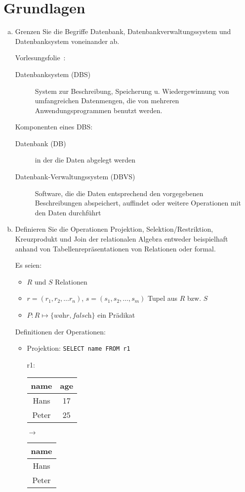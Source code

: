 \section{Grundlagen}
\begin{enumerate}[a)]
	\item Grenzen Sie die Begriffe Datenbank, Datenbankverwaltungssystem und Datenbanksystem voneinander ab.

	\begin{solution}
	Vorlesungsfolie~\DBSvsDBvsDBMS:
	\begin{description}
		\item[Datenbanksystem (DBS)] System zur Beschreibung, Speicherung u. Wiedergewinnung von umfangreichen Datenmengen, die von mehreren Anwendungsprogrammen benutzt werden.
	\end{description}
	Komponenten eines DBS:
	\begin{description}
		\item[Datenbank (DB)] in der die Daten abgelegt werden
		\item[Datenbank-Verwaltungssystem (DBVS)] Software, die die Daten entsprechend den vorgegebenen Beschreibungen abspeichert, auffindet oder weitere Operationen mit den Daten durchführt
	\end{description}
	\end{solution}


	\item Definieren Sie die Operationen Projektion, Selektion/Restriktion, Kreuzprodukt und Join der relationalen Algebra entweder beispielhaft anhand von Tabellenrepräsentationen von Relationen oder formal.

	\begin{solution}
	Es seien:
	\begin{itemize}
		\item $R$ und $S$ Relationen
		\item $r = (r_1, r_2, \ldots r_n)$, $s = (s_1, s_2, \ldots, s_m)$ Tupel aus $R$ bzw. $S$
		\item $P: R \mapsto \{\textit{wahr}, \textit{falsch}\}$ ein Prädikat
	\end{itemize}

	Definitionen der Operationen:

	\begin{itemize}
		\item Projektion: \texttt{SELECT name FROM r1}

		r1: \\
		\begin{tabular}{ | c | c | }
			\hline
			name 	& 		age	\\
			\hline
			Hans 	& 		17 	\\
			\hline
			Peter 	& 		25 	\\
			\hline
		\end{tabular}
		$\rightarrow$
		\begin{tabular}{ | c | }
			\hline
			name \\
			\hline
			Hans \\
			\hline
			Peter \\
			\hline
		\end{tabular}


\end{itemize}
\end{solution}
\end{enumerate}
